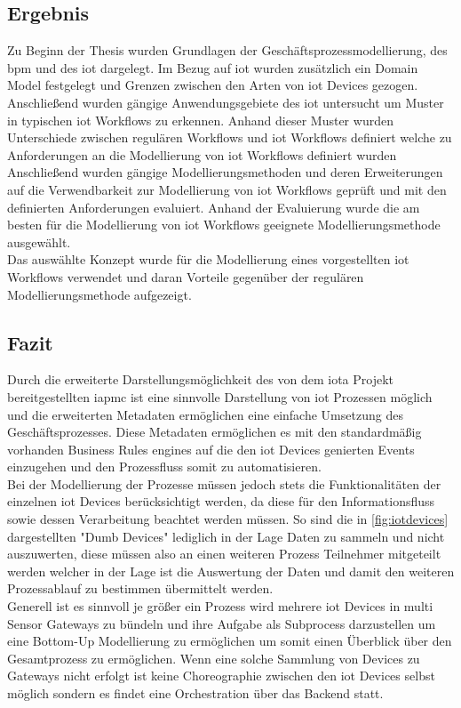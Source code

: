 \documentclass[a4paper, 12pt, twoside, headsepline=true]{scrartcl} %
\begin{document}
\subsection{Ergebnis}
Zu Beginn der Thesis wurden Grundlagen der Geschäftsprozessmodellierung, des \acl{bpm} und des \acl{iot} dargelegt. Im Bezug auf \ac{iot} wurden zusätzlich ein Domain Model festgelegt und  Grenzen zwischen den Arten von \ac{iot} Devices gezogen.\\
Anschließend wurden gängige Anwendungsgebiete des \ac{iot} untersucht um Muster in typischen \ac{iot} Workflows zu erkennen. Anhand dieser Muster wurden Unterschiede zwischen regulären Workflows und \ac{iot} Workflows definiert welche zu Anforderungen an die Modellierung von \ac{iot} Workflows definiert wurden\\
Anschließend wurden gängige Modellierungsmethoden und deren Erweiterungen auf die Verwendbarkeit zur Modellierung von \ac{iot} Workflows geprüft und mit den definierten Anforderungen evaluiert. Anhand der Evaluierung wurde die am besten für die Modellierung von \ac{iot} Workflows geeignete Modellierungsmethode ausgewählt.\\
Das auswählte Konzept wurde für die Modellierung eines vorgestellten \ac{iot} Workflows verwendet und daran Vorteile gegenüber der regulären Modellierungsmethode aufgezeigt.

\subsection{Fazit}
Durch die erweiterte Darstellungsmöglichkeit des von dem \acl{iota} Projekt bereitgestellten \acl{iapmc} ist eine sinnvolle Darstellung von \ac{iot} Prozessen möglich und die erweiterten Metadaten ermöglichen eine einfache Umsetzung des Geschäftsprozesses. Diese Metadaten ermöglichen es mit den standardmäßig vorhanden Business Rules engines auf die den \ac{iot} Devices genierten Events einzugehen und den Prozessfluss somit zu automatisieren.\\
Bei der Modellierung der Prozesse müssen jedoch stets die Funktionalitäten der einzelnen \ac{iot} Devices berücksichtigt werden, da diese für den Informationsfluss sowie dessen Verarbeitung beachtet werden müssen. So sind die in \ref{fig:iotdevices} dargestellten "Dumb Devices" lediglich in der Lage Daten zu sammeln und nicht auszuwerten, diese müssen also an einen weiteren Prozess Teilnehmer mitgeteilt werden welcher in der Lage ist die Auswertung der Daten und damit den weiteren Prozessablauf zu bestimmen übermittelt werden.\\
Generell ist es sinnvoll je größer ein Prozess wird mehrere \ac{iot} Devices in multi Sensor Gateways zu bündeln und ihre Aufgabe als Subprocess darzustellen um eine Bottom-Up Modellierung zu ermöglichen um somit einen Überblick über den Gesamtprozess zu ermöglichen. Wenn eine solche Sammlung von Devices zu Gateways nicht erfolgt ist keine Choreographie zwischen den \ac{iot} Devices selbst möglich sondern es findet eine Orchestration über das Backend statt.
\end{document}
